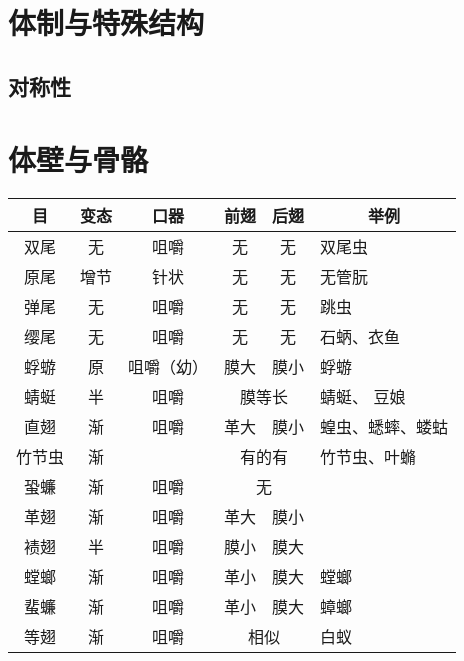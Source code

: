 \section{体制与特殊结构}

\subsection{对称性}


\section{体壁与骨骼}



\begin{table}[]
	\centering
	\begin{tabular}{|c|c|c|cc|l|}
		\hline
		\textbf{目} & \textbf{变态} & \textbf{口器} & \multicolumn{1}{c|}{\textbf{前翅}} & \textbf{后翅} & \multicolumn{1}{c|}{\textbf{举例}} \\ \hline
		双尾 & 无 & 咀嚼 & \multicolumn{1}{c|}{无} & 无 & 双尾虫 \\ \hline
		原尾 & 增节 & 针状 & \multicolumn{1}{c|}{无} & 无 & 无管朊 \\ \hline
		弹尾 & 无 & 咀嚼 & \multicolumn{1}{c|}{无} & 无 & 跳虫 \\ \hline
		缨尾 & 无 & 咀嚼 & \multicolumn{1}{c|}{无} & 无 & 石蛃、衣鱼 \\ \hline
		蜉蝣 & 原 & 咀嚼（幼） & \multicolumn{1}{c|}{膜大} & 膜小 & 蜉蝣 \\ \hline
		蜻蜓 & 半 & 咀嚼 & \multicolumn{2}{c|}{膜等长} & 蜻蜓、 豆娘 \\ \hline
		直翅 & 渐 & 咀嚼 & \multicolumn{1}{c|}{革大} & 膜小 & 蝗虫、蟋蟀、蝼蛄 \\ \hline
		竹节虫 & 渐 &  & \multicolumn{2}{c|}{有的有} & 竹节虫、叶䗛 \\ \hline
		蛩蠊 & 渐 & 咀嚼 & \multicolumn{2}{c|}{无} &  \\ \hline
		革翅 & 渐 & 咀嚼 & \multicolumn{1}{c|}{革大} & 膜小 &  \\ \hline
		{\CJKfontspec{SimSun-ExtB}𫌀}翅 & 半 & 咀嚼 & \multicolumn{1}{c|}{膜小} & 膜大 &  \\ \hline
		螳螂 & 渐 & 咀嚼 & \multicolumn{1}{c|}{革小} & 膜大 & 螳螂 \\ \hline
		蜚蠊 & 渐 & 咀嚼 & \multicolumn{1}{c|}{革小} & 膜大 & 蟑螂 \\ \hline
		等翅 & 渐 & 咀嚼 & \multicolumn{2}{c|}{相似} & 白蚁 \\ \hline

\end{tabular}
\end{table}
